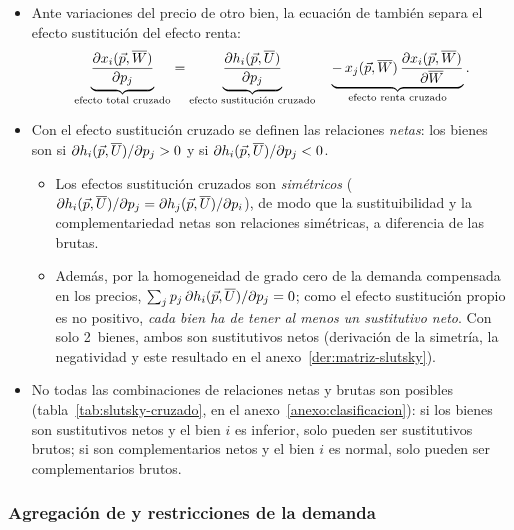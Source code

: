 \documentclass[11pt]{article}
\begin{document}
\begin{itemize}
\item Ante variaciones del precio de otro bien, la ecuación de  también separa el efecto sustitución del efecto renta:
  \begin{equation}
  \underbrace{\frac{\partial x_i(\vec{p},\overline{W})}{\partial p_j}}_{\text{efecto total cruzado}}=\underbrace{\frac{\partial h_i(\vec{p},\overline{U})}{\partial p_j}}_{\text{efecto sustitución cruzado}}\quad\underbrace{-\,x_j(\vec{p},\overline{W})\,\frac{\partial x_i(\vec{p},\overline{W})}{\partial\overline{W}}}_{\text{efecto renta cruzado}}. \label{eq:slutsky-cruzada}
  \end{equation}
\item Con el efecto sustitución cruzado se definen las relaciones \emph{netas}: los bienes son  si $\partial h_i(\vec{p},\overline{U})/\partial p_j>0$ y  si $\partial h_i(\vec{p},\overline{U})/\partial p_j<0$.
  \begin{itemize}
  \item Los efectos sustitución cruzados son \emph{simétricos} ($\partial h_i(\vec{p},\overline{U})/\partial p_j=\partial h_j(\vec{p},\overline{U})/\partial p_i$), de modo que la sustituibilidad y la complementariedad netas son relaciones simétricas, a diferencia de las brutas.
  \item Además, por la homogeneidad de grado cero de la demanda compensada en los precios, $\sum_j p_j\,\partial h_i(\vec{p},\overline{U})/\partial p_j=0$; como el efecto sustitución propio es no positivo, \emph{cada bien ha de tener al menos un sustitutivo neto}. Con solo 2~bienes, ambos son sustitutivos netos (derivación de la simetría, la negatividad y este resultado en el anexo~\ref{der:matriz-slutsky})\nocite{MasColellWhinstonGreen1995,DeatonMuellbauer1980Economics}.
  \end{itemize}
\item No todas las combinaciones de relaciones netas y brutas son posibles (tabla~\ref{tab:slutsky-cruzado}, en el anexo~\ref{anexo:clasificacion}): si los bienes son sustitutivos netos y el bien $i$ es inferior, solo pueden ser sustitutivos brutos; si son complementarios netos y el bien $i$ es normal, solo pueden ser complementarios brutos.
\end{itemize}

\subsubsection{Agregación de  y restricciones de la demanda}\label{sec:agregacion-cournot-restricciones}
\end{document}

